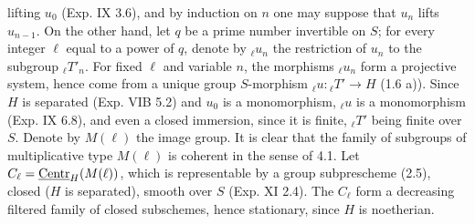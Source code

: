 lifting $u_0$ (Exp. IX 3.6), and by induction on $n$ one may suppose that $u_n$ lifts $u_{n-1}$. On the other hand, let $q$ be a prime number invertible on $S$; for every integer $\ell$ equal to a power of $q$, denote by ${}_\ell u_n$ the restriction of $u_n$ to the subgroup ${}_\ell T'_n$. For fixed $\ell$ and variable $n$, the morphisms ${}_\ell u_n$ form a projective system, hence come from a unique group $S$-morphism ${}_\ell u:{}_\ell T'\to H$ (1.6 a)). Since $H$ is separated (Exp. VIB 5.2) and $u_0$ is a monomorphism, ${}_\ell u$ is a monomorphism (Exp. IX 6.8), and even a closed immersion, since it is finite, ${}_\ell T'$ being finite over $S$. Denote by $M(\ell)$ the image group. It is clear that the family of subgroups of multiplicative type $M(\ell)$ is coherent in the sense of 4.1. Let $C_\ell=\underline{\mathrm{Centr}}_H(M(\ell))$, which is representable by a group subprescheme (2.5), closed ($H$ is separated), smooth over $S$ (Exp. XI 2.4). The $C_\ell$ form a decreasing filtered family of closed subschemes, hence stationary, since $H$ is noetherian.
